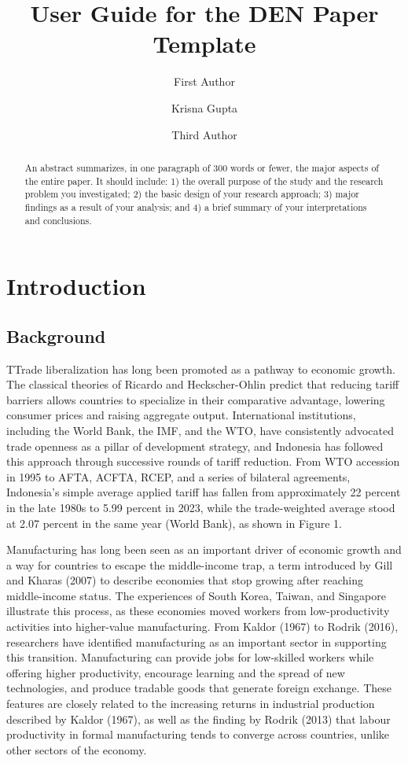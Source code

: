 \documentclass[
  manuscript=article,
  layout=publish,
  year=2026,
  volume=1,
]{den}
\title{User Guide for the DEN Paper Template}
\author{First Author \orcid{0000-0000-0000-0000}}
\affiliation{Institution-1, City, Country}
\author{Krisna Gupta \orcid{0000-0001-8695-8514}}
\affiliation{Dewan Ekonomi Nasional}
\author{Third Author}
\affiliation{Institution-3, City, Country}
\begin{document}
\begin{abstract}
An abstract summarizes, in one paragraph of 300 words or fewer, the
major aspects of the entire paper. It should include: 1) the overall
purpose of the study and the research problem you investigated; 2) the
basic design of your research approach; 3) major findings as a result of
your analysis; and 4) a brief summary of your interpretations and
conclusions.
\end{abstract}

\section{Introduction}\label{introduction}

\subsection{Background}\label{background}

TTrade liberalization has long been promoted as a pathway to economic
growth. The classical theories of Ricardo and Heckscher-Ohlin predict
that reducing tariff barriers allows countries to specialize in their
comparative advantage, lowering consumer prices and raising aggregate
output. International institutions, including the World Bank, the IMF,
and the WTO, have consistently advocated trade openness as a pillar of
development strategy, and Indonesia has followed this approach through
successive rounds of tariff reduction. From WTO accession in 1995 to
AFTA, ACFTA, RCEP, and a series of bilateral agreements, Indonesia's
simple average applied tariff has fallen from approximately 22 percent
in the late 1980s to 5.99 percent in 2023, while the trade-weighted
average stood at 2.07 percent in the same year (World Bank), as shown in
Figure 1.

Manufacturing has long been seen as an important driver of economic
growth and a way for countries to escape the middle-income trap, a term
introduced by Gill and Kharas (2007) to describe economies that stop
growing after reaching middle-income status. The experiences of South
Korea, Taiwan, and Singapore illustrate this process, as these economies
moved workers from low-productivity activities into higher-value
manufacturing. From Kaldor (1967) to Rodrik (2016), researchers have
identified manufacturing as an important sector in supporting this
transition. Manufacturing can provide jobs for low-skilled workers while
offering higher productivity, encourage learning and the spread of new
technologies, and produce tradable goods that generate foreign exchange.
These features are closely related to the increasing returns in
industrial production described by Kaldor (1967), as well as the finding
by Rodrik (2013) that labour productivity in formal manufacturing tends
to converge across countries, unlike other sectors of the economy.
\end{document}
